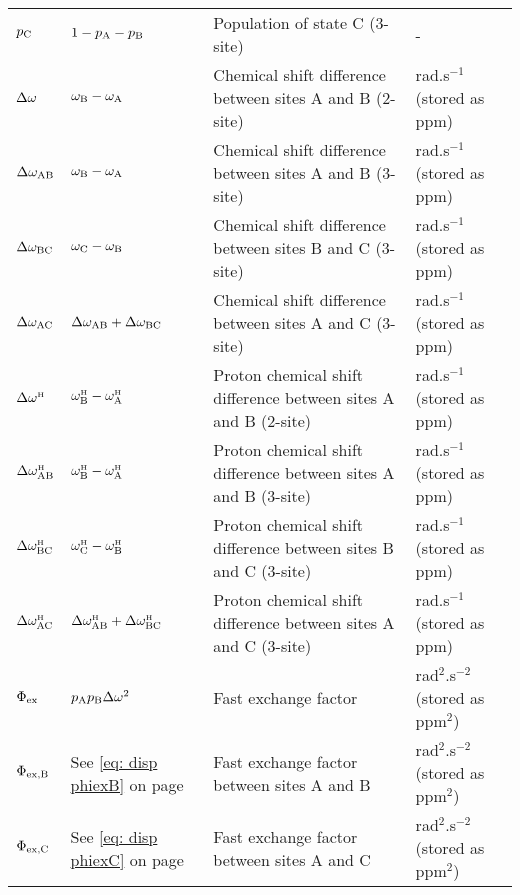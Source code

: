 \begin{landscape}
\begin{center}
\begin{small}
\begin{longtable}{llll}
$p_\textrm{C}$              & $1-p_\textrm{A}-p_\textrm{B}$                    & Population of state C (3-site)                                                & - \\
$\Delta\omega$              & $\omega_\textrm{B}-\omega_\textrm{A}$              & Chemical shift difference between sites A and B (2-site)                      & rad.s$^{-1}$ (stored as ppm) \\
$\Delta\omega_\textrm{AB}$            & $\omega_\textrm{B}-\omega_\textrm{A}$              & Chemical shift difference between sites A and B (3-site)                      & rad.s$^{-1}$ (stored as ppm) \\
$\Delta\omega_\textrm{BC}$            & $\omega_\textrm{C}-\omega_\textrm{B}$              & Chemical shift difference between sites B and C (3-site)                      & rad.s$^{-1}$ (stored as ppm) \\
$\Delta\omega_\textrm{AC}$            & $\Delta\omega_\textrm{AB}+\Delta\omega_\textrm{BC}$                  & Chemical shift difference between sites A and C (3-site)                      & rad.s$^{-1}$ (stored as ppm) \\
$\Delta\omega^{\scriptscriptstyle\mathrm{H}}$             & $\omega^{\scriptscriptstyle\mathrm{H}}_\textrm{B}-\omega^{\scriptscriptstyle\mathrm{H}}_\textrm{A}$            & Proton chemical shift difference between sites A and B (2-site)               & rad.s$^{-1}$ (stored as ppm) \\
$\Delta\omega^{\scriptscriptstyle\mathrm{H}}_\textrm{AB}$           & $\omega^{\scriptscriptstyle\mathrm{H}}_\textrm{B}-\omega^{\scriptscriptstyle\mathrm{H}}_\textrm{A}$            & Proton chemical shift difference between sites A and B (3-site)               & rad.s$^{-1}$ (stored as ppm) \\
$\Delta\omega^{\scriptscriptstyle\mathrm{H}}_\textrm{BC}$           & $\omega^{\scriptscriptstyle\mathrm{H}}_\textrm{C}-\omega^{\scriptscriptstyle\mathrm{H}}_\textrm{B}$            & Proton chemical shift difference between sites B and C (3-site)               & rad.s$^{-1}$ (stored as ppm) \\
$\Delta\omega^{\scriptscriptstyle\mathrm{H}}_\textrm{AC}$           & $\Delta\omega^{\scriptscriptstyle\mathrm{H}}_\textrm{AB}+\Delta\omega^{\scriptscriptstyle\mathrm{H}}_\textrm{BC}$                & Proton chemical shift difference between sites A and C (3-site)               & rad.s$^{-1}$ (stored as ppm) \\
$\Phi_\textrm{ex}$           & $p_\textrm{A}p_\textrm{B}\Delta\omega^2$                  & Fast exchange factor                                                          & rad$^2$.s$^{-2}$ (stored as ppm$^2$) \\
$\Phi_\textrm{ex,B}$          & See \ref{eq: disp phiexB} on page \pageref{eq: disp phiexB} & Fast exchange factor between sites A and B       & rad$^2$.s$^{-2}$ (stored as ppm$^2$) \\
$\Phi_\textrm{ex,C}$          & See \ref{eq: disp phiexC} on page \pageref{eq: disp phiexC} & Fast exchange factor between sites A and C       & rad$^2$.s$^{-2}$ (stored as ppm$^2$) \\

\end{longtable}
\end{small}
\end{center}
\end{landscape}
